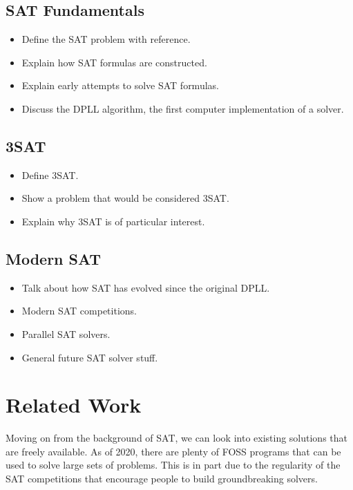 \documentclass{article}
\begin{document}

\subsection{SAT Fundamentals}
\begin{itemize}
    \item Define the SAT problem with reference.
    \item Explain how SAT formulas are constructed.
    \item Explain early attempts to solve SAT formulas.
    \item Discuss the DPLL algorithm, the first computer implementation of a solver.
\end{itemize}

\subsection{3SAT}
\begin{itemize}
    \item Define 3SAT.
    \item Show a problem that would be considered 3SAT.
    \item Explain why 3SAT is of particular interest.
\end{itemize}

\subsection{Modern SAT}
\begin{itemize}
    \item Talk about how SAT has evolved since the original DPLL.
    \item Modern SAT competitions.
    \item Parallel SAT solvers.
    \item General future SAT solver stuff.
\end{itemize}

\section{Related Work}
Moving on from the background of SAT, we can look into existing solutions that are freely available.
As of 2020, there are plenty of FOSS programs that can be used to solve large sets of problems. This
is in part due to the regularity of the SAT competitions that encourage people to build
groundbreaking solvers.
\end{document}
